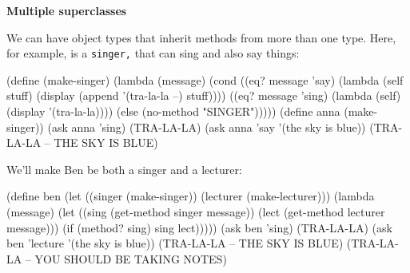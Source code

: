 %
%
%
%
%
%
%
%
%
%

{\bf Multiple superclasses}

We can have object types that inherit methods from more than one type.
Here, for example, is a {\tt singer,} that can sing and also say things:

\beginlisp
(define (make-singer)
  (lambda (message)
    (cond ((eq? message 'say)
           (lambda (self stuff)
             (display (append '(tra-la-la --) stuff))))
          ((eq? message 'sing)
           (lambda (self)
             (display '(tra-la-la))))
          (else (no-method "SINGER")))))
\null
(define anna (make-singer))
\null
(ask anna 'sing)
(TRA-LA-LA)
\null
(ask anna 'say '(the sky is blue))
(TRA-LA-LA -- THE SKY IS BLUE)
\null
\endlisp

We'll make Ben be both a singer and a lecturer:

\beginlisp
(define ben
  (let ((singer (make-singer))
        (lecturer (make-lecturer)))
    (lambda (message)
      (let ((sing (get-method singer message))
            (lect (get-method lecturer message)))
        (if (method? sing)
            sing
            lect)))))
\null
(ask ben 'sing)
(TRA-LA-LA)
\null
(ask ben 'lecture '(the sky is blue))
(TRA-LA-LA -- THE SKY IS BLUE)
(TRA-LA-LA -- YOU SHOULD BE TAKING NOTES)
\null
\endlisp

